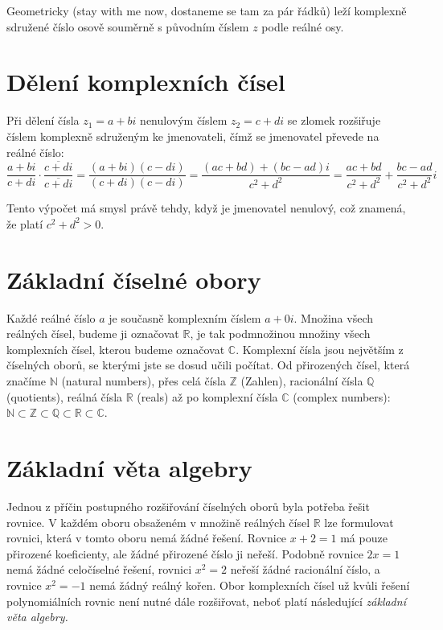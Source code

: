 \documentclass[12pt,a4paper]{report}
\begin{document}
	Geometricky (stay with me now, dostaneme se tam za pár řádků) leží komplexně sdružené číslo osově souměrně s původním číslem $z$ podle reálné osy.
	
	
	\section{Dělení komplexních čísel}
	Při dělení čísla $z_1 = a + bi$ nenulovým číslem 
	$z_2 = c + di$ se zlomek rozšiřuje číslem komplexně sdruženým ke jmenovateli, čímž se jmenovatel převede na reálné číslo:
	\begin{equation}
		\frac{a+bi}{c+di}\cdot\frac{\overline{c+di}}{\overline{c+di}} = \frac{(a+bi)(c-di)}{(c+di)(c-di)} = \frac{(ac+bd) + (bc-ad)i}{c^2+d^2} = \frac{ac+bd}{c^2+d^2} + \frac{bc-ad}{c^2+d^2}i
	\end{equation}
	
	Tento výpočet má smysl právě tehdy, když je jmenovatel nenulový, což znamená, že platí $c^2+d^2 > 0$.
	
	\medskip
	
	
	\section{Základní číselné obory}
	
	Každé reálné číslo $a$ je současně komplexním číslem $a + 0i$. Množina všech reálných čísel, budeme ji označovat $\mathbb{R}$, je tak podmnožinou množiny všech komplexních čísel, kterou budeme označovat $\mathbb{C}$. Komplexní čísla jsou největším z číselných oborů, se kterými jste se dosud učili počítat. Od přirozených čísel, která značíme $\mathbb{N}$ (natural numbers), přes celá čísla $\mathbb{Z}$ (Zahlen), racionální čísla $\mathbb{Q}$ (quotients), reálná čísla $\mathbb{R}$ (reals) až po komplexní čísla $\mathbb{C}$ (complex numbers): $\mathbb{N}\subset \mathbb{Z}\subset \mathbb{Q}\subset \mathbb{R}\subset \mathbb{C}$.
	
	
	\section{Základní věta algebry}
	
	Jednou z příčin postupného rozšiřování číselných oborů byla potřeba řešit rovnice. V každém oboru obsaženém v množině reálných čísel $\mathbb{R}$ lze formulovat rovnici, která v tomto oboru nemá žádné řešení. Rovnice $x + 2 = 1$ má pouze přirozené koeficienty, ale žádné přirozené číslo ji neřeší. Podobně rovnice $2x = 1$ nemá žádné celočíselné řešení, rovnici $x^2 = 2$ neřeší žádné racionální číslo, a rovnice $x^2 = -1$ nemá žádný reálný kořen. Obor komplexních čísel už kvůli řešení polynomiálních rovnic není nutné dále rozšiřovat, neboť platí následující \textit{základní věta algebry.}
	
\end{document}
